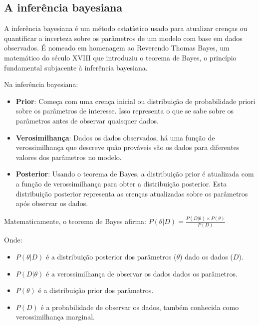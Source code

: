 \begin{apendicesenv}
	\chapter{A inferência bayesiana}
	\label{ch:bayesInfer}
	
	\par A inferência bayesiana é um método estatístico usado para atualizar crenças ou quantificar a incerteza sobre os parâmetros de um modelo com base em dados observados. É nomeado em homenagem ao Reverendo Thomas Bayes, um matemático do século XVIII que introduziu o teorema de Bayes, o princípio fundamental subjacente à inferência bayesiana.
	
	\par Na inferência bayesiana:
	\begin{itemize}
		\item \textbf{Prior}: Começa com uma crença inicial ou distribuição de probabilidade priori sobre os parâmetros de interesse. Isso representa o que se sabe sobre os parâmetros antes de observar quaisquer dados.
		
		\item \textbf{Verosimilhança}: Dados os dados observados, há uma função de verossimilhança que descreve quão prováveis são os dados para diferentes valores dos parâmetros no modelo.
		
		\item \textbf{Posterior}: Usando o teorema de Bayes, a distribuição prior é atualizada com a função de verossimilhança para obter a distribuição posterior. Esta distribuição posterior representa as crenças atualizadas sobre os parâmetros após observar os dados.
	\end{itemize}
	
	\par Matematicamente, o teorema de Bayes afirma: $ P(\theta|D) = \frac{P(D|\theta) \times P(\theta)}{P(D)} $
	
	Onde:\par
	\begin{itemize}
		\item $ P(\theta|D) $ é a distribuição posterior dos parâmetros ($ \theta $) dado os dados ($ D $).
		\item $ P(D|\theta) $ é a verossimilhança de observar os dados dados os parâmetros.
		\item $ P(\theta) $ é a distribuição prior dos parâmetros.
		\item $ P(D) $ é a probabilidade de observar os dados, também conhecida como verossimilhança marginal.
	\end{itemize}


\end{apendicesenv}
